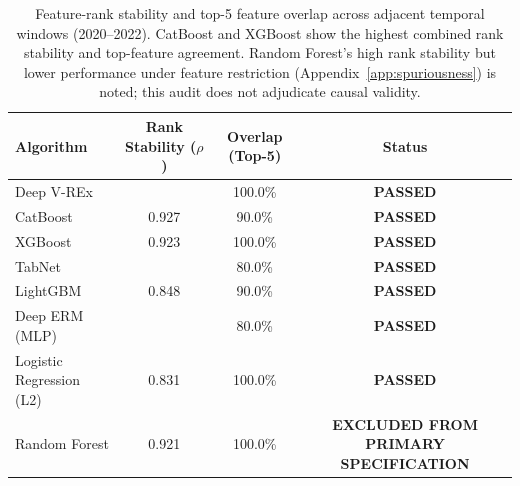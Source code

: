 \begin{table}[H]
    \centering
    \begin{tabular}{lccc}
        \toprule
        \textbf{Algorithm} & \textbf{Rank Stability ($\rho$)} & \textbf{Overlap (Top-5)} & \textbf{Status} \\
        \midrule
        Deep V-REx & \metricStabVREx{} & 100.0\% & \textbf{PASSED} \\
        CatBoost & 0.927 & 90.0\% & \textbf{PASSED} \\
        XGBoost & 0.923 & 100.0\% & \textbf{PASSED} \\
        TabNet & \metricStabTabNet{} & 80.0\% & \textbf{PASSED} \\
        LightGBM & 0.848 & 90.0\% & \textbf{PASSED} \\
        Deep ERM (MLP) & \metricStabERM{} & 80.0\% & \textbf{PASSED} \\
        Logistic Regression (L2) & 0.831 & 100.0\% & \textbf{PASSED} \\
        Random Forest & 0.921 & 100.0\% & \textbf{EXCLUDED FROM PRIMARY SPECIFICATION} \\
        \bottomrule
    \end{tabular}
    \caption[Model Feature-Rank Stability Summary]{Feature-rank stability and top-5 feature overlap across adjacent temporal windows (2020--2022). CatBoost and XGBoost show the highest combined rank stability and top-feature agreement. Random Forest's high rank stability but lower performance under feature restriction (Appendix~\ref{app:spuriousness}) is noted; this audit does not adjudicate causal validity.}
    \label{tab:disqualification_matrix}
\end{table}
